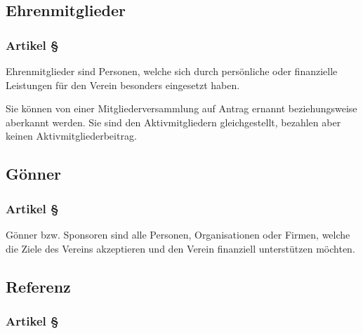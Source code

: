 \subsection{Ehrenmitglieder}

\subsubsection*{Artikel §\articlenumber}
Ehrenmitglieder sind Personen, welche sich durch persönliche oder finanzielle
Leistungen für den Verein besonders eingesetzt haben.

Sie können von einer Mitgliederversammlung auf Antrag ernannt beziehungsweise
aberkannt werden. Sie sind den Aktivmitgliedern gleichgestellt, bezahlen aber
keinen Aktivmitgliederbeitrag.

\subsection{Gönner}

\subsubsection*{Artikel §\articlenumber}
Gönner bzw. Sponsoren sind alle Personen, Organisationen oder Firmen, welche
die Ziele des Vereins akzeptieren und den Verein finanziell unterstützen
möchten.

\subsection{Referenz}
\subsubsection*{Artikel §\articlenumber}

